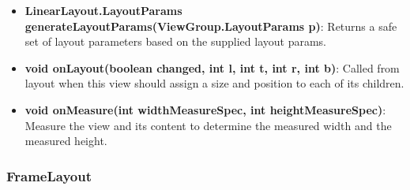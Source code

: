 \documentclass{report}
\begin{document}
\begin{itemize}
\begin{itemize}
                \item \textbf{LinearLayout.LayoutParams	generateLayoutParams(ViewGroup.LayoutParams p)}: Returns a safe set of layout parameters based on the supplied layout params.
                \item \textbf{void	onLayout(boolean changed, int l, int t, int r, int b)}: Called from layout when this view should assign a size and position to each of its children.
                \item \textbf{void	onMeasure(int widthMeasureSpec, int heightMeasureSpec)}: Measure the view and its content to determine the measured width and the measured height.
            \end{itemize}
    \end{itemize}

    \pagebreak 
    \subsubsection{FrameLayout}
\end{document}
